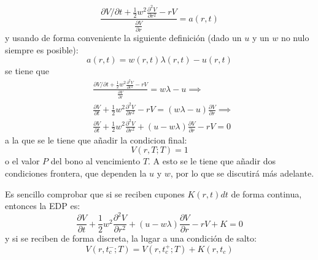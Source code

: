 \begin{equation*}
    \frac{\partial V/\partial t + \frac{1}{2} w^2 \frac{\partial^2 V}{\partial r^2} - rV}{\frac{\partial V}{\partial r}} = a(r,t)
\end{equation*}
y usando de forma conveniente la siguiente definición (dado un $u$ y un $w$ no nulo siempre es posible):
\begin{equation*}
    a(r,t) = w(r,t)\lambda(r,t) - u(r,t)
\end{equation*}
se tiene que
\begin{align}\label{eq:edp_bono}
    &\frac{\partial V/\partial t + \frac{1}{2} w^2 \frac{\partial^2 V}{\partial r^2} - rV}{\frac{\partial V}{\partial r}} = w\lambda - u \implies \nonumber\\
    &\frac{\partial V}{\partial t} + \frac{1}{2} w^2 \frac{\partial^2 V}{\partial r^2} - rV = (w\lambda - u) \frac{\partial V}{\partial r} \implies \nonumber\\[1.5em]
    &\boxed{\frac{\partial V}{\partial t} + \frac{1}{2} w^2 \frac{\partial^2 V}{\partial r^2} + (u - w\lambda) \frac{\partial V}{\partial r} - rV = 0}
\end{align}
a la que se le tiene que añadir la condicion final:
\begin{equation*}
    \boxed{V(r,T;T) = 1}
\end{equation*}
o el valor $P$ del bono al vencimiento $T$. A esto se le tiene que añadir dos condiciones frontera, que dependen la $u$ y $w$, por lo que se discutirá más adelante.

Es sencillo comprobar que si se reciben cupones $K(r,t)dt$ de forma continua, entonces la EDP es:
\begin{equation*}
    \boxed{\frac{\partial V}{\partial t} + \frac{1}{2} w^2 \frac{\partial^2 V}{\partial r^2} + (u - w\lambda) \frac{\partial V}{\partial r} - rV + K = 0}
\end{equation*}
y si se reciben de forma discreta, la lugar a una condición de salto:
\begin{equation*}
    \boxed{V(r,t_c^-;T) = V(r,t_c^+;T) + K(r,t_c)}
\end{equation*}


